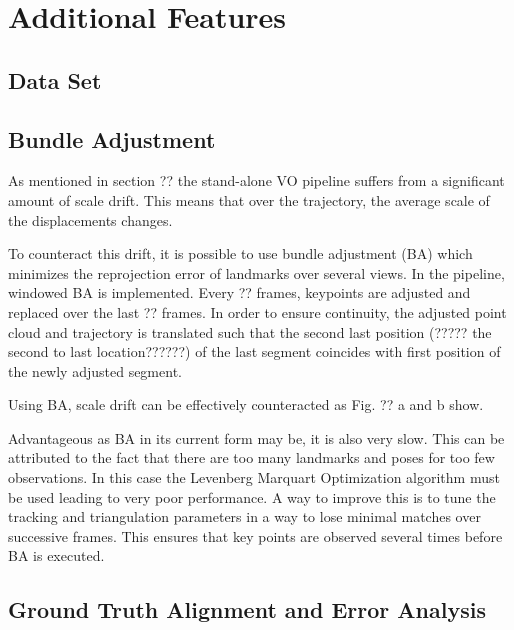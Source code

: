 \chapter{Additional Features}
\section{Data Set}
\label{dataset}

\section{Bundle Adjustment}
\label{bundle adjustment}
As mentioned in section ?? the stand-alone VO pipeline suffers from a significant amount of scale drift. This means that over the trajectory, the average scale of the displacements changes. \par
To counteract this drift, it is possible to use bundle adjustment (BA) which minimizes the reprojection error of landmarks over several views. In the pipeline, windowed BA is implemented. Every ?? frames, keypoints are adjusted and replaced over the last ?? frames. In order to ensure continuity, the adjusted point cloud and trajectory is translated such that the second last position (????? the second to last location??????) of the last segment coincides with first position of the newly adjusted segment. \par
Using BA, scale drift can be effectively counteracted as Fig. ?? a and b show. \par
Advantageous as BA in its current form may be, it is also very slow. This can be attributed to the fact that there are too many landmarks and poses for too few observations. In this case the Levenberg Marquart Optimization algorithm must be used leading to very poor performance. A way to improve this is to tune the tracking and triangulation parameters in a way to lose minimal matches over successive frames. This ensures that key points are observed several times before BA is executed. 

\section{Ground Truth Alignment and Error Analysis}
\label{simulation}

